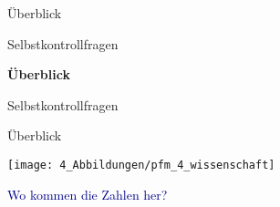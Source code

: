 \documentclass[
  8pt,
  ignorenonframetext,
]{beamer}
\begin{document}
\begin{frame}{}
\protect\hypertarget{section-2}{}
\Large
{}
\vfill

Überblick

Selbstkontrollfragen \vfill
\end{frame}

\begin{frame}{}
\protect\hypertarget{section-3}{}
\Large
{}
\vfill

\textbf{Überblick}

Selbstkontrollfragen \vfill
\end{frame}

\begin{frame}{Überblick}
\protect\hypertarget{uxfcberblick}{}
\vfill

\begin{center}\texttt{[image: 4\_Abbildungen/pfm\_4\_wissenschaft]} \end{center}
\center
\vspace{2mm}
\large

\textcolor{darkblue}{Wo kommen die Zahlen her?}
\end{frame}
\end{document}
